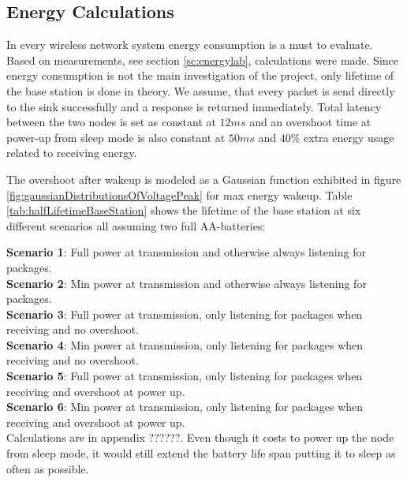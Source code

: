 \subsection{Energy Calculations}\label{sc:energyCalculations}

In every wireless network system energy consumption is a must to evaluate. Based on measurements, see section \ref{sc:energylab}, calculations were made. Since energy consumption is not the main investigation of the project, only lifetime of the base station is done in theory. We assume, that every packet is send directly to the sink successfully and a response is returned immediately. Total latency between the two nodes is set as constant at $12 ms$ and an overshoot time at power-up from sleep mode is also constant at $50 ms$ and $40\%$ extra energy usage related to receiving energy.

\noindent The overshoot after wakeup is modeled as a Gaussian function exhibited in figure \ref{fig:gaussianDistributionsOfVoltagePeak} for max energy wakeup. Table \ref{tab:halfLifetimeBaseStation} shows the lifetime of the base station at six different scenarios all assuming two full AA-batteries:%

\noindent \textbf{Scenario 1}: Full power at transmission and otherwise always listening for packages.\\
\textbf{Scenario 2}: Min power at transmission and otherwise always listening for packages.\\
\textbf{Scenario 3}: Full power at transmission, only listening for packages when receiving and no overshoot.\\
\textbf{Scenario 4}: Min power at transmission, only listening for packages when receiving and no overshoot.\\
\textbf{Scenario 5}: Full power at transmission, only listening for packages when receiving and overshoot at power up.\\
\textbf{Scenario 6}: Min power at transmission, only listening for packages when receiving and overshoot at power up.\\

Calculations are in appendix ??????. Even though it costs to power up the node from sleep mode, it would still extend the battery life span putting it to sleep as often as possible. %

